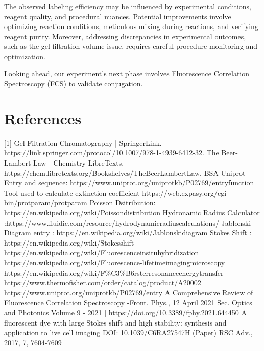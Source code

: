 \documentclass[a4paper,english,12pt,bibliography=totoc]{scrreprt}
\begin{document}
The observed labeling efficiency may be influenced by experimental conditions, reagent quality, and procedural nuances. Potential improvements involve optimizing reaction conditions, meticulous mixing during reactions, and verifying reagent purity. Moreover, addressing discrepancies in experimental outcomes, such as the gel filtration volume issue, requires careful procedure monitoring and optimization.

Looking ahead, our experiment's next phase involves Fluorescence Correlation Spectroscopy (FCS) to validate conjugation.


\chapter{References}
\label{cha:References}

[1] Gel-Filtration Chromatography | SpringerLink. https://link.springer.com/protocol/10.1007/978-1-4939-6412-32.
\newline[2] The Beer-Lambert Law - Chemistry LibreTexts. https://chem.libretexts.org/Bookshelves/TheBeerLambertLaw.
\newline[3] BSA Uniprot Entry and sequence: https://www.uniprot.org/uniprotkb/P02769/entryfunction
\newline[4]Tool used to calculate extinction coefficient https://web.expasy.org/cgi-bin/protparam/protparam
\newline[5] Poisson Dsitribution: https://en.wikipedia.org/wiki/Poissondistribution
\newline[6] Hydronamic Radius Calculator :https://www.fluidic.com/resource/hydrodynamicradiuscalculations/
\newline[7] Jablonski Diagram entry : https://en.wikipedia.org/wiki/Jablonskidiagram
\newline[8] Stokes Shift : https://en.wikipedia.org/wiki/Stokesshift
\newline[9] https://en.wikipedia.org/wiki/Fluorescenceinsituhybridization
\newline[10] https://en.wikipedia.org/wiki/Fluorescence-lifetimeimagingmicroscopy
\newline[11] https://en.wikipedia.org/wiki/F\%C3\%B6rsterresonanceenergytransfer
\newline[12] https://www.thermofisher.com/order/catalog/product/A20002
\newline[13] https://www.uniprot.org/uniprotkb/P02769/entry
\newline[14] A Comprehensive Review of Fluorescence Correlation Spectroscopy -Front. Phys., 12 April 2021 Sec. Optics and Photonics Volume 9 - 2021 | https://doi.org/10.3389/fphy.2021.644450
\newline[15] A fluorescent dye with large Stokes shift and high stability: synthesis and application to live cell imaging DOI: 10.1039/C6RA27547H (Paper) RSC Adv., 2017, 7, 7604-7609
\end{document}

